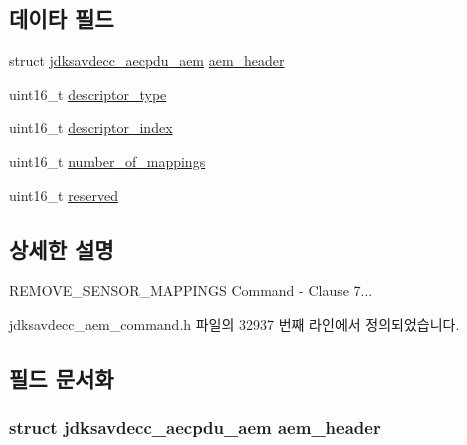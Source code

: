 \subsection*{데이타 필드}
\begin{DoxyCompactItemize}
\item 
struct \hyperlink{structjdksavdecc__aecpdu__aem}{jdksavdecc\+\_\+aecpdu\+\_\+aem} \hyperlink{structjdksavdecc__aem__command__remove__sensor__mappings_ae1e77ccb75ff5021ad923221eab38294}{aem\+\_\+header}
\item 
uint16\+\_\+t \hyperlink{structjdksavdecc__aem__command__remove__sensor__mappings_ab7c32b6c7131c13d4ea3b7ee2f09b78d}{descriptor\+\_\+type}
\item 
uint16\+\_\+t \hyperlink{structjdksavdecc__aem__command__remove__sensor__mappings_a042bbc76d835b82d27c1932431ee38d4}{descriptor\+\_\+index}
\item 
uint16\+\_\+t \hyperlink{structjdksavdecc__aem__command__remove__sensor__mappings_ac7db472c5622ef473d5d0a5c416d5531}{number\+\_\+of\+\_\+mappings}
\item 
uint16\+\_\+t \hyperlink{structjdksavdecc__aem__command__remove__sensor__mappings_a5a6ed8c04a3db86066924b1a1bf4dad3}{reserved}
\end{DoxyCompactItemize}


\subsection{상세한 설명}
R\+E\+M\+O\+V\+E\+\_\+\+S\+E\+N\+S\+O\+R\+\_\+\+M\+A\+P\+P\+I\+N\+GS Command -\/ Clause 7... 

jdksavdecc\+\_\+aem\+\_\+command.\+h 파일의 32937 번째 라인에서 정의되었습니다.



\subsection{필드 문서화}
\subsubsection[{\texorpdfstring{aem\+\_\+header}{aem_header}}]{\setlength{\rightskip}{0pt plus 5cm}struct {\bf jdksavdecc\+\_\+aecpdu\+\_\+aem} aem\+\_\+header}\hypertarget{structjdksavdecc__aem__command__remove__sensor__mappings_ae1e77ccb75ff5021ad923221eab38294}{}\label{structjdksavdecc__aem__command__remove__sensor__mappings_ae1e77ccb75ff5021ad923221eab38294}


